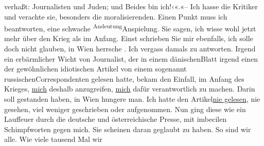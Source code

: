 \begin{ledgroupsized}[t]{13cm}
{{{                     verhaßt: Journalisten und Juden; und Beides bin ich!‹«.}}}\label{K_L02223_1h}«– Ich
               hasse die Kritiker und verachte sie, besonders die moralisierenden.\pend
           \pstart
           Einen Punkt muss ich beantworten, eine schwache \substVorne{}\textsuperscript{Andeutung}{\allowbreak}\substDazwischen{}Anspielung\substHinten{}. Sie sagen, ich wisse wohl jetzt mehr über den Krieg als im Anfang. Einst
               schrieben Sie mir ebenfalls, ich solle doch nicht glauben, in Wien herrsche \label{K_L02223_2v}\label{K_L02223_2h}. {\pb}Ich vergass damals zu
               antworten.\pend
           \pstart
           Irgend ein erbärmlicher Wicht von Journalist, der in einem dänischenBlatt irgend einen der gewöhnlichen idiotischen Artikel von einem sogenannt russischenCorrespondenten gelesen hatte,
               bekam den Einfall, im Anfang des Krieges, \uline{mich}
               deshalb anzugreifen, \uline{mich} dafür verantwortlich zu
               machen. Darin soll gestanden haben, in Wien hungere
               man.\pend
           \pstart
           Ich hatte den Artikel\uline{nie gelesen}, nie gesehen, viel weniger geschrieben
               oder aufgenommen. Nun ging diese \label{K_L02223_3v}\label{K_L02223_3h}
               wie ein Lauffeuer durch die deutsche und österreichische Presse, mit imbecilen Schimpfworten
               gegen mich.\pend
           \pstart
           Sie scheinen daran geglaubt zu haben. So sind wir alle. Wie viele tausend Mal wir

\end{ledgroupsized}
